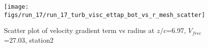 \begin{figure}[H]
\centering
\texttt{[image: figs/run\_17/run\_17\_turb\_visc\_ettap\_bot\_vs\_r\_mesh\_scatter]}
\caption{Scatter plot of velocity gradient term vs radius at $z/c$=6.97, $V_{free}$=27.03, station2}
\label{fig:run_17_turb_visc_ettap_bot_vs_r_mesh_scatter}
\end{figure}


